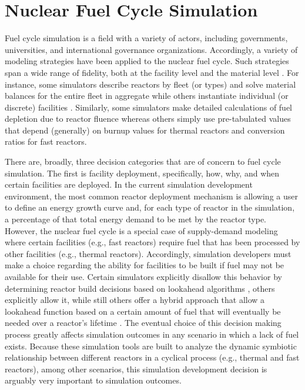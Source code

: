 
\section{Nuclear Fuel Cycle Simulation}\label{intro:fcs}
 
Fuel cycle simulation is a field with a variety of actors, including
governments, universities, and international governance
organizations. Accordingly, a variety of modeling strategies have been applied
to the nuclear fuel cycle. Such strategies span a wide range of fidelity, both
at the facility level and the material level
\cite{boucher_cosi:_2006,busquim_e_silva_system_2008,yacout_vision_2006}. For
instance, some simulators describe reactors by fleet (or types) and solve
material balances for the entire fleet in aggregate while others instantiate
individual (or discrete) facilities \cite{schneider_nfcsim:_2005}. Similarly,
some simulators make detailed calculations of fuel depletion due to reactor
fluence whereas others simply use pre-tabulated values
that depend (generally) on burnup values for thermal reactors and conversion
ratios for fast reactors. 

There are, broadly, three decision categories that are of concern to fuel cycle
simulation. The first is facility deployment, specifically, how, why, and when
certain facilities are deployed. In the current simulation development
environment, the most common reactor deployment mechanism is allowing a user to
define an energy growth curve and, for each type of reactor in the simulation, a
percentage of that total energy demand to be met by the reactor type. However,
the nuclear fuel cycle is a special case of supply-demand modeling where certain
facilities (e.g., fast reactors) require fuel that has been processed by other
facilities (e.g., thermal reactors). Accordingly, simulation developers must
make a choice regarding the ability for facilities to be built if fuel may not
be available for their use. Certain simulators explicitly disallow this behavior
by determining reactor build decisions based on lookahead algorithms
\cite{schweitzer_improved_2008}, others explicitly allow it, while still others
offer a hybrid approach that allow a lookahead function based on a certain
amount of fuel that will eventually be needed over a reactor's lifetime
\cite{van_den_durpel_daness_2009}. The eventual choice of this decision making
process greatly affects simulation outcomes in any scenario in which a lack of
fuel exists. Because these simulation tools are built to analyze the dynamic
symbiotic relationship between different reactors in a cyclical process (e.g.,
thermal and fast reactors), among other scenarios, this simulation development
decision is arguably very important to simulation outcomes.

